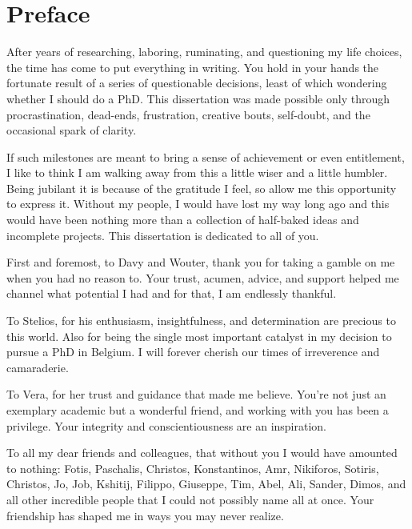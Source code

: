 \chapter*{Preface}
\label{ch:preface}

After years of researching, laboring, ruminating, and questioning my life choices, the time has come to put everything in writing.
You hold in your hands the fortunate result of a series of questionable decisions, least of which wondering whether I should do a PhD.
This dissertation was made possible only through procrastination, dead-ends, frustration, creative bouts, self-doubt, and the occasional spark of clarity.

If such milestones are meant to bring a sense of achievement or even entitlement, I like to think I am walking away from this a little wiser and a little humbler.
Being jubilant it is because of the gratitude I feel, so allow me this opportunity to express it.
Without my people, I would have lost my way long ago and this would have been nothing more than a collection of half-baked ideas and incomplete projects.
This dissertation is dedicated to all of you.

First and foremost, to Davy and Wouter, thank you for taking a gamble on me when you had no reason to. Your trust, acumen, advice, and support helped me channel what potential I had and for that, I am endlessly thankful.

To Stelios, for his enthusiasm, insightfulness, and determination are precious to this world. Also for being the single most important catalyst in my decision to pursue a PhD in Belgium. I will forever cherish our times of irreverence and camaraderie.

To Vera, for her trust and guidance that made me believe. You're not just an exemplary academic but a wonderful friend, and working with you has been a privilege. Your integrity and conscientiousness are an inspiration.

To all my dear friends and colleagues, that without you I would have amounted to nothing: Fotis, Paschalis, Christos, Konstantinos, Amr, Nikiforos, Sotiris, Christos, Jo, Job, Kshitij, Filippo, Giuseppe, Tim, Abel, Ali, Sander, Dimos, and all other incredible people that I could not possibly name all at once.
Your friendship has shaped me in ways you may never realize.

